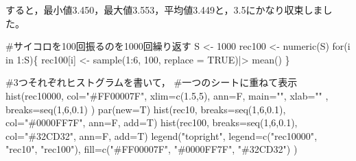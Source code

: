 \documentclass[
  letterpaper,
  DIV=11,
  numbers=noendperiod]{scrreprt}
\newenvironment{Shaded}{\begin{snugshade}}{\end{snugshade}}
\newcommand{\AttributeTok}[1]{\textcolor[rgb]{0.40,0.45,0.13}{#1}}
\newcommand{\CommentTok}[1]{\textcolor[rgb]{0.37,0.37,0.37}{#1}}
\newcommand{\ConstantTok}[1]{\textcolor[rgb]{0.56,0.35,0.01}{#1}}
\newcommand{\ControlFlowTok}[1]{\textcolor[rgb]{0.00,0.23,0.31}{#1}}
\newcommand{\DecValTok}[1]{\textcolor[rgb]{0.68,0.00,0.00}{#1}}
\newcommand{\FloatTok}[1]{\textcolor[rgb]{0.68,0.00,0.00}{#1}}
\newcommand{\FunctionTok}[1]{\textcolor[rgb]{0.28,0.35,0.67}{#1}}
\newcommand{\NormalTok}[1]{\textcolor[rgb]{0.00,0.23,0.31}{#1}}
\newcommand{\OtherTok}[1]{\textcolor[rgb]{0.00,0.23,0.31}{#1}}
\newcommand{\SpecialCharTok}[1]{\textcolor[rgb]{0.37,0.37,0.37}{#1}}
\newcommand{\StringTok}[1]{\textcolor[rgb]{0.13,0.47,0.30}{#1}}
\begin{document}
すると，最小値3.450，最大値3.553，平均値3.449と，3.5にかなり収束しました。

\begin{Shaded}
\begin{Highlighting}[]
\CommentTok{\#サイコロを100回振るのを1000回繰り返す}
\NormalTok{S }\OtherTok{\textless{}{-}} \DecValTok{1000}
\NormalTok{rec100 }\OtherTok{\textless{}{-}} \FunctionTok{numeric}\NormalTok{(S)}
\ControlFlowTok{for}\NormalTok{(i }\ControlFlowTok{in} \DecValTok{1}\SpecialCharTok{:}\NormalTok{S)\{}
\NormalTok{  rec100[i] }\OtherTok{\textless{}{-}} \FunctionTok{sample}\NormalTok{(}\DecValTok{1}\SpecialCharTok{:}\DecValTok{6}\NormalTok{, }\DecValTok{100}\NormalTok{, }\AttributeTok{replace =} \ConstantTok{TRUE}\NormalTok{)}\SpecialCharTok{|\textgreater{}}
    \FunctionTok{mean}\NormalTok{()}
\NormalTok{\}}

\CommentTok{\#3つそれぞれヒストグラムを書いて，}
\CommentTok{\#一つのシートに重ねて表示}
\FunctionTok{hist}\NormalTok{(rec10000, }
     \AttributeTok{col=}\StringTok{"\#FF00007F"}\NormalTok{, }
     \AttributeTok{xlim=}\FunctionTok{c}\NormalTok{(}\FloatTok{1.5}\NormalTok{,}\DecValTok{5}\NormalTok{),}
     \AttributeTok{ann=}\NormalTok{F, }
     \AttributeTok{main=}\StringTok{""}\NormalTok{, }
     \AttributeTok{xlab=}\StringTok{""}\NormalTok{ ,}
     \AttributeTok{breaks=}\FunctionTok{seq}\NormalTok{(}\DecValTok{1}\NormalTok{,}\DecValTok{6}\NormalTok{,}\FloatTok{0.1}\NormalTok{)}
\NormalTok{     )}
\FunctionTok{par}\NormalTok{(}\AttributeTok{new=}\NormalTok{T)}
\FunctionTok{hist}\NormalTok{(rec10, }
     \AttributeTok{breaks=}\FunctionTok{seq}\NormalTok{(}\DecValTok{1}\NormalTok{,}\DecValTok{6}\NormalTok{,}\FloatTok{0.1}\NormalTok{),}
     \AttributeTok{col=}\StringTok{"\#0000FF7F"}\NormalTok{,}
     \AttributeTok{ann=}\NormalTok{F, }
     \AttributeTok{add=}\NormalTok{T)}
\FunctionTok{hist}\NormalTok{(rec100, }
     \AttributeTok{breaks=}\FunctionTok{seq}\NormalTok{(}\DecValTok{1}\NormalTok{,}\DecValTok{6}\NormalTok{,}\FloatTok{0.1}\NormalTok{),}
     \AttributeTok{col=}\StringTok{"\#32CD32"}\NormalTok{,}
     \AttributeTok{ann=}\NormalTok{F, }
     \AttributeTok{add=}\NormalTok{T)}
\FunctionTok{legend}\NormalTok{(}\StringTok{"topright"}\NormalTok{, }
       \AttributeTok{legend=}\FunctionTok{c}\NormalTok{(}\StringTok{"rec10000"}\NormalTok{, }
                \StringTok{"rec10"}\NormalTok{, }
                \StringTok{"rec100"}\NormalTok{),}
       \AttributeTok{fill=}\FunctionTok{c}\NormalTok{(}\StringTok{"\#FF00007F"}\NormalTok{, }
              \StringTok{"\#0000FF7F"}\NormalTok{,}
              \StringTok{"\#32CD32"}\NormalTok{)}
\NormalTok{       )}
\end{Highlighting}
\end{Shaded}
\end{document}
